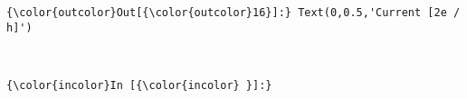 \documentclass[11pt]{article}
\begin{document}
\begin{Verbatim}[commandchars=\\\{\}]
{\color{outcolor}Out[{\color{outcolor}16}]:} Text(0,0.5,'Current [2e / h]')
\end{Verbatim}
            
    \begin{center}
    \end{center}
    { \hspace*{\fill} \\}
    
    \begin{Verbatim}[commandchars=\\\{\}]
{\color{incolor}In [{\color{incolor} }]:} 
\end{Verbatim}



    
    
    
    
\end{document}
